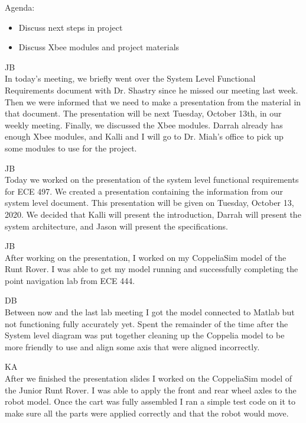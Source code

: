 \documentclass[fontsize=11pt, %
                             paper=letter, %
                             openany, %
                             captions=tableheading,
                             index=totoc,
                             hyperref]{labbook}
\begin{document}
\begin{addmargin}[0cm]{0cm}
Agenda:
\begin{itemize}
    \item Discuss next steps in project
    \item Discuss Xbee modules and project materials
\end{itemize}

JB\\
In today's meeting, we briefly went over the System Level Functional Requirements document with Dr. Shastry since he missed our meeting last week. Then we were informed that we need to make a presentation from the material in that document. The presentation will be next Tuesday, October 13th, in our weekly meeting. Finally, we discussed the Xbee modules. Darrah already has enough Xbee modules, and Kalli and I will go to Dr. Miah's office to pick up some modules to use for the project.



JB\\
Today we worked on the presentation of the system level functional requirements for ECE 497. We created a presentation containing the information from our system level document. This presentation will be given on Tuesday, October 13, 2020. We decided that Kalli will present the introduction, Darrah will present the system architecture, and Jason will present the specifications.

JB\\
After working on the presentation, I worked on my CoppeliaSim model of the Runt Rover. I was able to get my model running and successfully completing the point navigation lab from ECE 444.

\vspace*{12pt}DB\\
Between now and the last lab meeting I got the model connected to Matlab but not functioning fully accurately yet.  Spent the remainder of the time after the System level diagram was put together cleaning up the Coppelia model to be more friendly to use and align some axis that were aligned incorrectly.

\vspace*{12pt}
KA\\
After we finished the presentation slides I worked on the CoppeliaSim model of the Junior Runt Rover. I was able to apply the front and rear wheel axles to the robot model. Once the cart was fully assembled I ran a simple test code on it to make sure all the parts were applied correctly and that the robot would move.


\end{addmargin}
\end{document}
